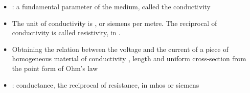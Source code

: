 \begin{ELunit}

\begin{itemize}
\item
  : a fundamental parameter of the medium, called the conductivity
\item
  The unit of conductivity is , or siemens per metre. The reciprocal of conductivity is called resistivity, in .
\item
  Obtaining the relation between the voltage and the current of a piece of homogeneous material of conductivity \ELim{\sigma}, length \ELim{\ell} and uniform cross-section  from the point form of Ohm's law
\end{itemize}



\end{ELunit}

\begin{ELimportant}{}


\end{ELimportant}

\begin{ELunit}

\begin{itemize}
\tightlist
\item
  : conductance, the reciprocal of resistance, in mhos or siemens
\end{itemize}

\end{ELunit}

\ELhold


